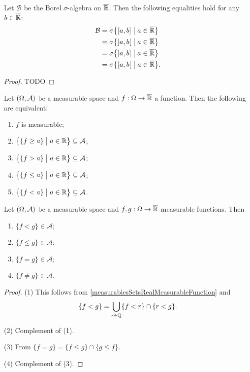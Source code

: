 \begin{proposition}
Let $\mathcal{B}$ be the Borel $\sigma$-algebra on $\overline{\mathbb{R}}$. Then the following equalities hold for any $b\in\overline{\mathbb{R}}$:
\begin{align*}
\mathcal{B} &= \sigma\setbuilder{\interval[c]{a,b}}{a\in \overline{\R}}\\
&= \sigma\setbuilder{\interval[o]{a,b}}{a\in \overline{\R}} \\
&= \sigma\setbuilder{\interval[oc]{a,b}}{a\in \overline{\R}} \\
&= \sigma\setbuilder{\interval[co]{a,b}}{a\in \overline{\R}}.
\end{align*}
\end{proposition}
\begin{proof}
TODO
\end{proof}
\begin{corollary} \label{measurablesSetsRealMeasurableFunction}
Let $\sSet{\Omega, \mathcal{A}}$ be a measurable space and $f: \Omega \to \overline{\mathbb{R}}$ a function. Then the following are equivalent:
\begin{enumerate}
\item $f$ is measurable;
\item $\setbuilder{\{f\geq a\}\big.}{a\in\R} \subseteq \mathcal{A}$;
\item $\setbuilder{\{f > a\}\big.}{a\in\R} \subseteq \mathcal{A}$;
\item $\setbuilder{\{f \leq a\}\big.}{a\in\R} \subseteq \mathcal{A}$;
\item $\setbuilder{\{f < a\}\big.}{a\in\R} \subseteq \mathcal{A}$.
\end{enumerate}
\end{corollary}

\begin{proposition} \label{measurablesSetsTwoRealMeasurableFunctions}
Let $\sSet{\Omega, \mathcal{A}}$ be a measurable space and $f,g: \Omega \to \overline{\mathbb{R}}$ measurable functions. Then
\begin{enumerate}
\item $\{f < g\} \in \mathcal{A}$;
\item $\{f \leq g\} \in \mathcal{A}$;
\item $\{f = g\} \in \mathcal{A}$;
\item $\{f \neq g\} \in \mathcal{A}$.
\end{enumerate}
\end{proposition}
\begin{proof}
(1) This follows from \ref{measurablesSetsRealMeasurableFunction} and
\[ \{f < g \} = \bigcup_{r\in\mathbb{Q}}\{f<r\}\cap \{r < g\}. \]

(2) Complement of (1).

(3) From $\{f = g\} = \{f \leq g\}\cap \{g \leq f\}$.

(4) Complement of (3).
\end{proof}

